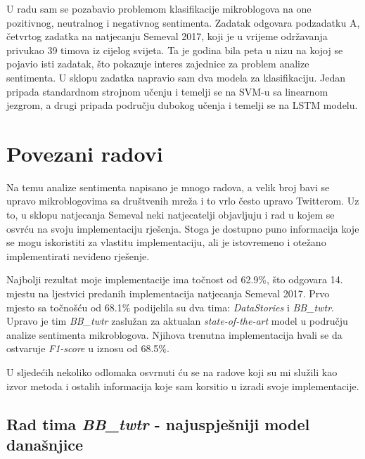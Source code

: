 \documentclass[times, utf8, zavrsni]{fer}
\begin{document}
U radu sam se pozabavio problemom klasifikacije mikroblogova na one pozitivnog, neutralnog i negativnog sentimenta. Zadatak odgovara podzadatku A, četvrtog zadatka na natjecanju Semeval 2017, koji je u vrijeme održavanja privukao 39 timova iz cijelog svijeta. Ta je godina bila peta u nizu na kojoj se pojavio isti zadatak, što pokazuje interes zajednice za problem analize sentimenta. U sklopu zadatka napravio sam dva modela za klasifikaciju. Jedan pripada standardnom strojnom učenju i temelji se na SVM-u sa linearnom jezgrom, a drugi pripada području dubokog učenja i temelji se na LSTM modelu.

\chapter{Povezani radovi}


Na temu analize sentimenta napisano je mnogo radova, a velik broj bavi se upravo mikroblogovima sa društvenih mreža i to vrlo često upravo Twitterom. Uz to, u sklopu natjecanja Semeval neki natjecatelji objavljuju i rad u kojem se osvrću na svoju implementaciju rješenja. Stoga je dostupno puno informacija koje se mogu iskoristiti za vlastitu implementaciju, ali je istovremeno i otežano implementirati neviđeno rješenje. 

Najbolji rezultat moje implementacije ima točnost od 62.9\%, što odgovara 14. mjestu na ljestvici predanih implementacija natjecanja Semeval 2017. \citep{semeval2017task4} Prvo mjesto sa točnošću od 68.1\% podijelila su dva tima: \textit{DataStories} i \textit{BB\_twtr}. Upravo je tim \textit{BB\_twtr} zaslužan za aktualan \textit{state-of-the-art} model u području analize sentimenta mikroblogova. Njihova trenutna implementacija hvali se da ostvaruje  \textit{F1-score} u iznosu od 68.5\%.

U sljedećih nekoliko odlomaka osvrnuti ću se na radove koji su mi služili kao izvor metoda i ostalih informacija koje sam korsitio u izradi svoje implementacije.

\section{Rad tima \textit{BB\_twtr} - najuspješniji model današnjice}
\end{document}

